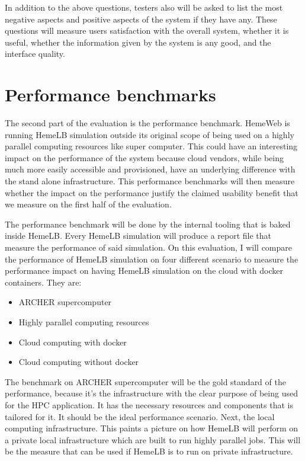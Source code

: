 In addition to the above questions, testers also will be asked to list the most negative aspects and positive aspects of the system if they have any. These questions will measure users satisfaction with the overall system, whether it is useful, whether the information given by the system is any good, and the interface quality.


\section{Performance benchmarks}

The second part of the evaluation is the performance benchmark. HemeWeb is running HemeLB simulation outside its original scope of being used on a highly parallel computing resources like super computer. This could have an interesting impact on the performance of the system because cloud vendors, while being much more easily accessible and provisioned, have an underlying difference with the stand alone infrastructure. This performance benchmarks will then measure whether the impact on the performance justify the claimed usability benefit that we measure on the first half of the evaluation.

The performance benchmark will be done by the internal tooling that is baked inside HemeLB. Every HemeLB simulation will produce a report file that measure the performance of said simulation. On this evaluation, I will compare the performance of HemeLB simulation on four different scenario to measure the performance impact on having HemeLB simulation on the cloud with docker containers. They are:
\begin{itemize}
	\item{ARCHER supercomputer}
	\item{Highly parallel computing resources}
	\item{Cloud computing with docker}
	\item{Cloud computing without docker}
\end{itemize}

The benchmark on ARCHER supercomputer will be the gold standard of the performance, because it's the infrastructure with the clear purpose of being used for the HPC application. It has the necessary resources and components that is tailored for it. It should be the ideal performance scenario. Next, the local computing infrastructure. This paints a picture on how HemeLB will perform on a private local infrastructure which are built to run highly parallel jobs. This will be the measure that can be used if HemeLB is to run on private infrastructure.

